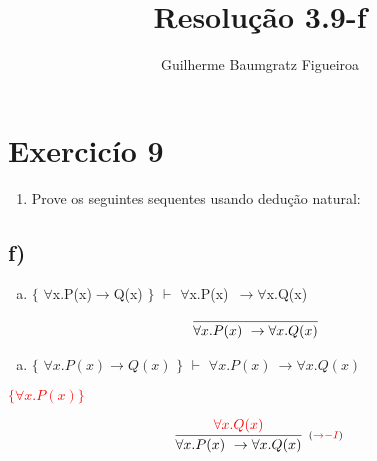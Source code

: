 \documentclass[aspectratio=43]{beamer}
\title[\sc{Resolu\c c\~ao}]{Resolu\c c\~ao 3.9-f}
\author[Guilherme Baumgratz Figueiroa]{Guilherme Baumgratz Figueiroa}
\institute[UFOP]{Universidade Federal de Ouro Preto} %
\date{}
\newcommand{\ria}{$\rightarrow$}
\newcommand{\fall}{$\forall$}
\begin{document}
	
	\begin{frame}
		\titlepage
	\end{frame}
	
	\section{Exercic\'io 9}
	
	\begin{frame}%
    
    	\begin{enumerate}[1.]
			\item Prove os seguintes sequentes usando dedu\c c\~ao natural: \\
		\end{enumerate}
				
	\end{frame}
    \subsection{f)}
    
    \begin{frame}[fragile]
    
    	\begin{enumerate}[f)]
			\item $\{$ \fall x.P(x)\ria Q(x) $\}$ $\vdash$ \fall x.P(x)\ \ria \fall x.Q(x) \\
		\end{enumerate}
        
        \vspace{65pt}
        
        \[
        \begin{array}{c}
		
        	\infer[_{}]
            	{\forall x.P(x)\ \to \forall x.Q(x)}
            	{}
        
		\end{array}
        \]
        
	\end{frame}
    
    \begin{frame}[fragile]
    
    	\begin{enumerate}[f)]
			\item $\{$ $\forall x.P(x)\to Q(x) $ $\}$ $\vdash$ $ \forall x.P(x)\ \to \forall x.Q(x) $ \\
		\end{enumerate}
        \textcolor{red}{ $\{\forall x.P(x)\}$}
        \vspace{60pt}
        
        \[
        \begin{array}{c}
		
        	\infer[_{(\textcolor{red}{\to -I})}]
            	{\forall x.P(x)\ \to \forall x.Q(x)}
            	{\textcolor{red}{\forall x.Q(x)}}
        
		\end{array}
        \]
        
	\end{frame}
    
\end{document}
